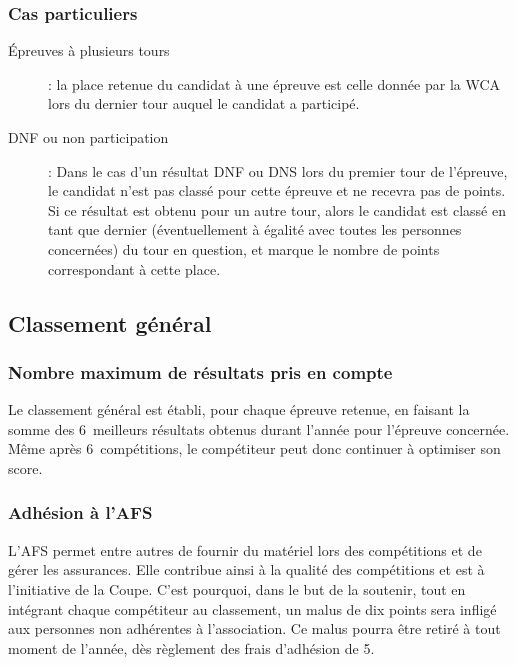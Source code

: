 \documentclass[10pt,a4paper]{article}
\newcommand{\3}{$3\times3$}
\newcommand{\4}{$4\times4$}
\newcommand{\2}{$2\times2$}
\newcommand{\maxcomp}{6} %
\begin{document}
\subsubsection{Cas particuliers}

\begin{description}
\item [Épreuves à plusieurs tours] : la place retenue du candidat à une épreuve est celle donnée par la WCA lors du dernier tour auquel le candidat a participé.
\item [DNF ou non participation] : Dans le cas d'un résultat DNF ou DNS lors du premier tour de l'épreuve, le candidat n'est pas classé pour cette épreuve et ne recevra pas de points. Si ce résultat est obtenu pour un autre tour, alors le candidat est classé en tant que dernier (éventuellement à égalité avec toutes les personnes concernées) du tour en question, et marque le nombre de points correspondant à cette place.
\end{description}


\subsection{Classement général}

\subsubsection{Nombre maximum de résultats pris en compte}

Le classement général est établi, pour chaque épreuve retenue, en faisant la somme des \maxcomp\ meilleurs résultats obtenus durant l'année pour l'épreuve concernée. Même après \maxcomp\ compétitions, le compétiteur peut donc continuer à optimiser son score.

\subsubsection{Adhésion à l'AFS}

L'AFS permet entre autres de fournir du matériel lors des compétitions et de gérer les assurances. Elle contribue ainsi à la qualité des compétitions et est à l'initiative de la Coupe. C'est pourquoi, dans le but de la soutenir, tout en intégrant chaque compétiteur au classement, un malus de dix points sera infligé aux personnes non adhérentes à l'association. Ce malus pourra être retiré à tout moment de l'année, dès règlement des frais d'adhésion de 5\texteuro .
\end{document}
